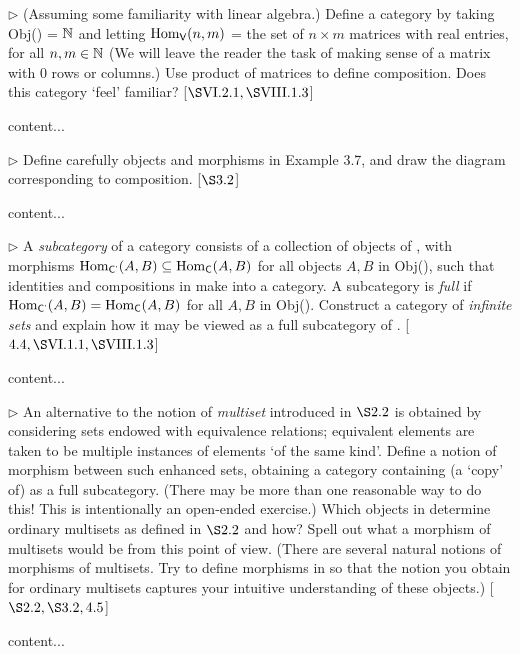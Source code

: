 \begin{exercise}
	\(\triangleright\) (Assuming some familiarity with linear algebra.) Define a category  by taking Obj() = \(\mathbb{N}\) and letting \(\Hom_{\text{\serif{V}}}(n,m)\) = the set of \(n \times m\) matrices with real entries, for all \(n, m \in \mathbb{N}\) (We will leave the reader the task of making sense of a matrix with 0 rows or columns.) Use product of matrices to define composition. Does this category ‘feel’ familiar? [\(\S \RN{6}.2.1, \S \RN{8}.1.3\)]
\end{exercise}
\begin{solution}
	content...
\end{solution}

\begin{exercise}
	\(\triangleright\) Define carefully objects and morphisms in Example 3.7, and draw the diagram
	corresponding to composition. [\(\S 3.2\)]
\end{exercise}
\begin{solution}
	content...
\end{solution}

\begin{exercise}
	\(\triangleright\) A \textit{subcategory}  of a category  consists of a collection of objects of , with morphisms \(\Hom_{\text{\serif{C'}}}(A,B) \subseteq \Hom_{\text{\serif{C}}}(A,B)\) for all objects \(A, B\) in Obj(), such that identities and compositions in  make  into a category. A subcategory  is \textit{full} if \(\Hom_{\text{\serif{C'}}}(A,B) = \Hom_{\text{\serif{C}}}(A,B)\) for all \(A, B\) in Obj(). Construct a category of \textit{infinite sets} and explain how it may be viewed as a full subcategory of . [\(4.4, \S \RN{6}.1.1, \S \RN{8}.1.3\)]
\end{exercise}
\begin{solution}
	content...
\end{solution}

\begin{exercise}
	\(\triangleright\) An alternative to the notion of \textit{multiset} introduced in \(\S 2.2\) is obtained by considering sets endowed with equivalence relations; equivalent elements are taken to be multiple instances of elements ‘of the same kind’. Define a notion of morphism between such enhanced sets, obtaining a category  containing (a ‘copy’ of)  as a full subcategory. (There may be more than one reasonable way to do this! This is intentionally an open-ended exercise.) Which objects in  determine ordinary multisets as defined in \(\S 2.2\) and how? Spell out what a morphism of multisets would be from this point of view. (There are several natural notions of morphisms of multisets. Try to define morphisms in  so that the notion you obtain for ordinary multisets captures your intuitive understanding of these objects.) [\(\S 2.2, \S 3.2, 4.5\)]
\end{exercise}
\begin{solution}
	content...
\end{solution}

